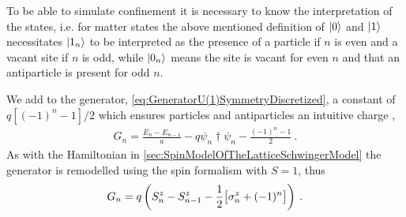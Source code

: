 \documentclass[../main.tex]{subfiles} %
\begin{document}
To be able to simulate confinement it is necessary to know the interpretation of the states, i.e. for matter states the above mentioned definition of $\ket{0}$ and $\ket{1}$ necessitates $\ket{1_n}$ to be interpreted as the presence of a particle if $n$ is even and a vacant site if $n$ is odd, while $\ket{0_n}$ means the site is vacant for even $n$ and that an antiparticle is present for odd $n$.

We add to the generator, \cref{eq:GeneratorU(1)SymmetryDiscretized}, a constant of $q[(-1)^n - 1]/2$ which ensures particles and antiparticles an intuitive charge \cite{panyella_masterThesis_2019},
\begin{align} \label{eq:GeneratorWithExtraConstant}
    G_n = \frac{E_n - E_{n-1}}{a} - q \psi_n\dagger \psi_n - \frac{(-1)^n - 1}{2} \: .
\end{align}
As with the Hamiltonian in \cref{sec:SpinModelOfTheLatticeSchwingerModel} the generator is remodelled using the spin formalism with $S=1$, thus
\begin{align} \label{eq:GeneratorU(1)SymmetrySpinVersion} \index{generator!of U(1) symmetry!discretized!with spin}\index{generator!of U(1) symmetry}
    G_n = q \left( S_n^z - S_{n-1}^z - \frac{1}{2} \big[ \sigma_n^z + (-1)^n \big] \right) \: .
\end{align}
%
\end{document}
